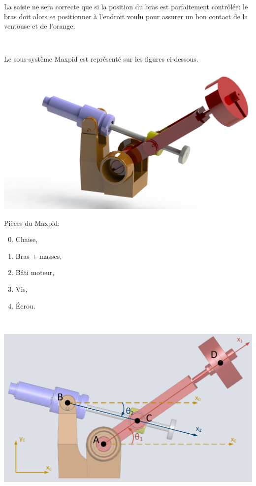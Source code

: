 La saisie ne sera correcte que si la position du bras est parfaitement contrôlée: le bras doit alors se positionner à l'endroit voulu pour assurer un bon contact de la ventouse et de l'orange. 

~\

Le sous-système Maxpid est représenté sur les figures ci-dessous.

\begin{minipage}{0.5\linewidth}
 \includegraphics[width=0.9\linewidth]{img/Maxpid3D}
\end{minipage}\hfill
\begin{minipage}{0.45\linewidth}
Pièces du Maxpid:
\begin{enumerate}\setcounter{enumi}{-1}
 \item Chaise,
 \item Bras + masses,
 \item Bâti moteur,
 \item Vis,
 \item Écrou.
\end{enumerate}
\end{minipage}

~\

\begin{center}
	\includegraphics[width=0.9\linewidth]{img/Maxpid_param}
\end{center}


